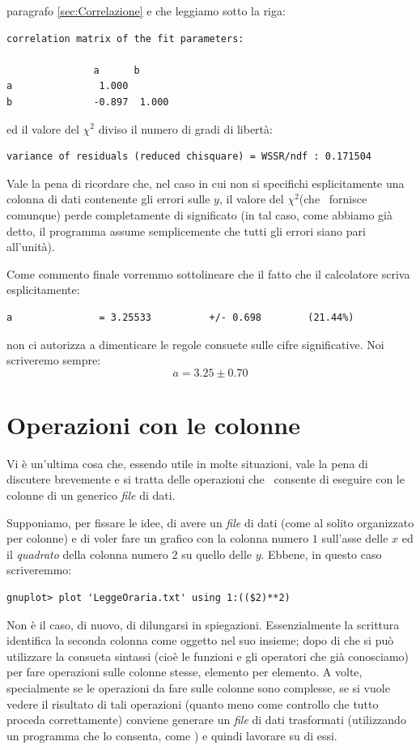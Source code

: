 paragrafo \ref{sec:Correlazione} e che leggiamo sotto la riga:
\begin{verbatim}
correlation matrix of the fit parameters:

               a      b
a               1.000
b              -0.897  1.000
\end{verbatim}
ed il valore del $\chi^2$ diviso il numero di gradi di libert\`a:
\begin{verbatim}
variance of residuals (reduced chisquare) = WSSR/ndf : 0.171504
\end{verbatim}
Vale la pena di ricordare che, nel caso in cui non si specifichi esplicitamente
una colonna di dati contenente gli errori sulle $y$, il valore del $\chi^2$(che
\gnuplot\ fornisce comunque) perde completamente di significato (in tal caso,
come abbiamo gi\`a detto, il programma assume semplicemente che tutti gli
errori siano pari all'unit\`a).

Come commento finale vorremmo sottolineare che il fatto che il calcolatore
scriva esplicitamente:
\begin{verbatim}
a               = 3.25533          +/- 0.698        (21.44%)
\end{verbatim}
non ci autorizza a dimenticare le regole consuete sulle cifre significative.
Noi scriveremo sempre:
$$
a = 3.25 \pm 0.70
$$


\section{Operazioni con le colonne}

Vi \`e un'ultima cosa che, essendo utile in molte situazioni, vale la pena
di discutere brevemente e si tratta delle operazioni che \gnuplot\ consente
di eseguire con le colonne di un generico \emph{file} di dati.

Supponiamo, per fissare le idee, di avere un \emph{file} di dati (come al
solito organizzato per colonne) e di voler fare un grafico con la colonna
numero $1$ sull'asse delle $x$ ed il \emph{quadrato} della colonna numero $2$
su quello delle $y$. Ebbene, in questo caso scriveremmo:
\begin{verbatim}
gnuplot> plot 'LeggeOraria.txt' using 1:(($2)**2)
\end{verbatim}
Non \`e il caso, di nuovo, di dilungarsi in spiegazioni. Essenzialmente
la scrittura  identifica la seconda colonna come oggetto nel suo
insieme; dopo di che si pu\`o utilizzare la consueta sintassi (cio\`e le
funzioni e gli operatori che gi\`a conosciamo) per fare operazioni sulle
colonne stesse, elemento per elemento.
A volte, specialmente se le operazioni da fare sulle colonne sono complesse,
se   si vuole vedere il risultato di tali operazioni (quanto meno come
controllo che tutto proceda correttamente) conviene generare un \emph{file} di
dati trasformati (utilizzando un programma che lo consenta, come \scilab) e
quindi lavorare su di essi.
